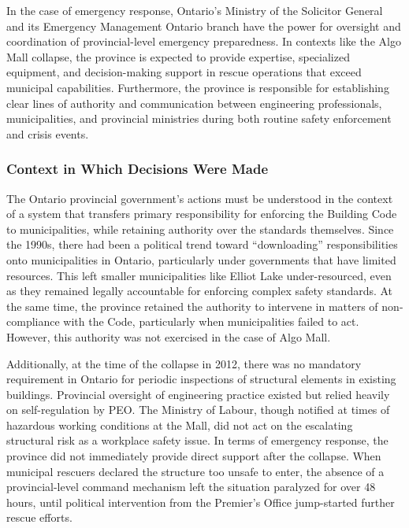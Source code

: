 \documentclass[12pt]{article}
\begin{document}
In the case of emergency response, Ontario's Ministry of the Solicitor General and its Emergency Management Ontario branch have the power for oversight and coordination of provincial-level emergency preparedness. In contexts like the Algo Mall collapse, the province is expected to provide expertise, specialized equipment, and decision-making support in rescue operations that exceed municipal capabilities. Furthermore, the province is responsible for establishing clear lines of authority and communication between engineering professionals, municipalities, and provincial ministries during both routine safety enforcement and crisis events.

\subsubsection*{Context in Which Decisions Were Made}
The Ontario provincial government’s actions must be understood in the context of a system that transfers primary responsibility for enforcing the Building Code to municipalities, while retaining authority over the standards themselves. Since the 1990s, there had been a political trend toward “downloading” responsibilities onto municipalities in Ontario, particularly under governments that have limited resources. This left smaller municipalities like Elliot Lake under-resourced, even as they remained legally accountable for enforcing complex safety standards. At the same time, the province retained the authority to intervene in matters of non-compliance with the Code, particularly when municipalities failed to act. However, this authority was not exercised in the case of Algo Mall.

Additionally, at the time of the collapse in 2012, there was no mandatory requirement in Ontario for periodic inspections of structural elements in existing buildings. Provincial oversight of engineering practice existed but relied heavily on self-regulation by PEO. The Ministry of Labour, though notified at times of hazardous working conditions at the Mall, did not act on the escalating structural risk as a workplace safety issue. In terms of emergency response, the province did not immediately provide direct support after the collapse. When municipal rescuers declared the structure too unsafe to enter, the absence of a provincial-level command mechanism left the situation paralyzed for over 48 hours, until political intervention from the Premier’s Office jump-started further rescue efforts.
\end{document}
